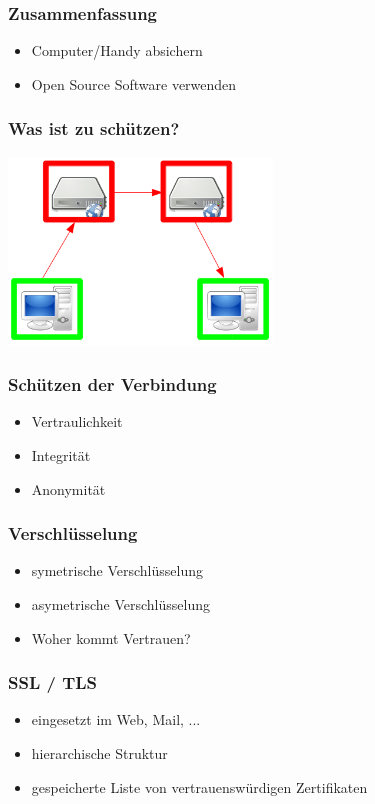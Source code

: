 \documentclass[12pt]{beamer}
\begin{document}
\begin{frame}
    \frametitle{Zusammenfassung}
    \begin{itemize}
      \item Computer/Handy absichern
      \item Open Source Software verwenden
    \end{itemize}
\end{frame}

\begin{frame}
    \frametitle{Was ist zu schützen?}
    \begin{center}
      \includegraphics[height=5cm]{img/fed-clients.png}
    \end{center}
\end{frame}

\begin{frame}
    \frametitle{Schützen der Verbindung}
    \begin{itemize}
      \item Vertraulichkeit
      \item Integrität
      \item Anonymität
    \end{itemize}
\end{frame}

\begin{frame}
    \frametitle{Verschlüsselung}
    \begin{itemize}
      \item<2-> symetrische Verschlüsselung
      \item<3-> asymetrische Verschlüsselung
      \item<4-> Woher kommt Vertrauen?
    \end{itemize}
\end{frame}

\begin{frame}
    \frametitle{SSL / TLS}
    \begin{itemize}
      \item<2-> eingesetzt im Web, Mail, ...
      \item<3-> hierarchische Struktur
      \item<4-> gespeicherte Liste von vertrauenswürdigen Zertifikaten
    \end{itemize}
\end{frame}
\end{document}
